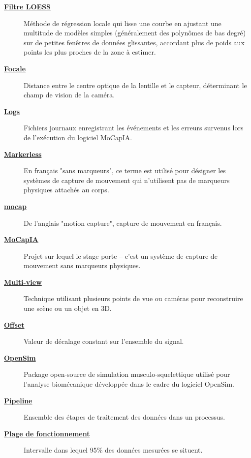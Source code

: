 \begin{description}
    \item[\textbf{\underline{Filtre LOESS}}] 
    Méthode de régression locale qui lisse une courbe en ajustant une multitude de modèles simples (généralement des polynômes de bas degré) sur de petites fenêtres de données glissantes, accordant plus de poids aux points les plus proches de la zone à estimer.

    \item[\textbf{\underline{Focale}}] 
    Distance entre le centre optique de la lentille et le capteur, déterminant le champ de vision de la caméra.

    \item[\textbf{\underline{Logs}}] 
    Fichiers journaux enregistrant les événements et les erreurs survenus lors de l'exécution du logiciel MoCapIA.

    \item[\textbf{\underline{Markerless}}] 
    En français "sans marqueurs", ce terme est utilisé pour désigner les systèmes de capture de mouvement qui n'utilisent pas de marqueurs physiques attachés au corps.

    \item[\textbf{\underline{mocap}}] 
    De l'anglais "motion capture", capture de mouvement en français.

    \item[\textbf{\underline{MoCapIA}}] 
    Projet sur lequel le stage porte – c'est un système de capture de mouvement sans marqueurs physiques.

    \item[\textbf{\underline{Multi-view}}] 
    Technique utilisant plusieurs points de vue ou caméras pour reconstruire une scène ou un objet en 3D.

    \item[\textbf{\underline{Offset}}] 
    Valeur de décalage constant sur l'ensemble du signal.

    \item[\textbf{\underline{OpenSim}}] 
    Package open-source de simulation musculo-squelettique utilisé pour l'analyse biomécanique développée dans le cadre du logiciel OpenSim.

    \item[\textbf{\underline{Pipeline}}] 
    Ensemble des étapes de traitement des données dans un processus.

    \item[\textbf{\underline{Plage de fonctionnement}}] 
    Intervalle dans lequel 95\% des données mesurées se situent.


\end{description}
